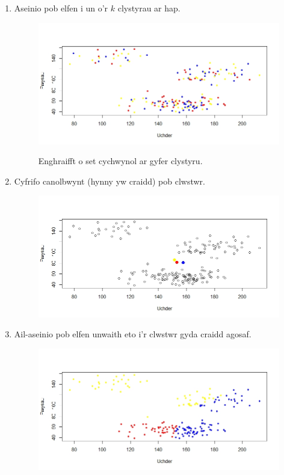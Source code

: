 \begin{enumerate}
\item Aseinio pob elfen i un o'r $k$ clystyrau ar hap.

\begin{figure}[H]
\begin{center}
\includegraphics[width=0.5\linewidth]{../img/Cam1.jpeg}
\label{fig:Enghraifft_o_set_cychwynol}
\caption{Enghraifft o set cychwynol ar gyfer clystyru.}
\end{center}
\end{figure}

\item Cyfrifo canolbwynt (hynny yw craidd) pob clwstwr.

\begin{figure}[H]
\begin{center}
\includegraphics[width=0.5\linewidth]{../img/ClystyrauCychwynol.jpeg}
\end{center}
\end{figure}

\item Ail-aseinio pob elfen unwaith eto i'r clwstwr gyda craidd agosaf.

\begin{figure}[H]
\begin{center}
\includegraphics[width=0.5\linewidth]{../img/Cam3.jpeg}
\end{center}
\end{figure}


\end{enumerate}
